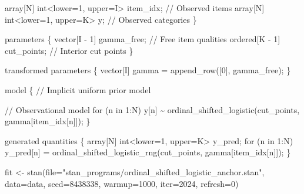 \documentclass[
  letterpaper,
  DIV=11,
  numbers=noendperiod]{scrartcl}
\newenvironment{Shaded}{\begin{snugshade}}{\end{snugshade}}
\newcommand{\AttributeTok}[1]{\textcolor[rgb]{0.40,0.45,0.13}{#1}}
\newcommand{\CommentTok}[1]{\textcolor[rgb]{0.37,0.37,0.37}{#1}}
\newcommand{\ControlFlowTok}[1]{\textcolor[rgb]{0.00,0.23,0.31}{#1}}
\newcommand{\DataTypeTok}[1]{\textcolor[rgb]{0.68,0.00,0.00}{#1}}
\newcommand{\DecValTok}[1]{\textcolor[rgb]{0.68,0.00,0.00}{#1}}
\newcommand{\FunctionTok}[1]{\textcolor[rgb]{0.28,0.35,0.67}{#1}}
\newcommand{\KeywordTok}[1]{\textcolor[rgb]{0.00,0.23,0.31}{#1}}
\newcommand{\NormalTok}[1]{\textcolor[rgb]{0.00,0.23,0.31}{#1}}
\newcommand{\OtherTok}[1]{\textcolor[rgb]{0.00,0.23,0.31}{#1}}
\newcommand{\StringTok}[1]{\textcolor[rgb]{0.13,0.47,0.30}{#1}}
\begin{document}
\begin{codelisting}
\begin{Shaded}
\begin{Highlighting}[]
  \DataTypeTok{array}\NormalTok{[N] }\DataTypeTok{int}\NormalTok{\textless{}}\KeywordTok{lower}\NormalTok{=}\DecValTok{1}\NormalTok{, }\KeywordTok{upper}\NormalTok{=I\textgreater{} item\_idx; }\CommentTok{// Observed items}
  \DataTypeTok{array}\NormalTok{[N] }\DataTypeTok{int}\NormalTok{\textless{}}\KeywordTok{lower}\NormalTok{=}\DecValTok{1}\NormalTok{, }\KeywordTok{upper}\NormalTok{=K\textgreater{} y;        }\CommentTok{// Observed categories}
\NormalTok{\}}

\KeywordTok{parameters}\NormalTok{ \{}
  \DataTypeTok{vector}\NormalTok{[I {-} }\DecValTok{1}\NormalTok{] gamma\_free;  }\CommentTok{// Free item qualities}
  \DataTypeTok{ordered}\NormalTok{[K {-} }\DecValTok{1}\NormalTok{] cut\_points; }\CommentTok{// Interior cut points}
\NormalTok{\}}

\KeywordTok{transformed parameters}\NormalTok{ \{}
  \DataTypeTok{vector}\NormalTok{[I] gamma = append\_row([}\DecValTok{0}\NormalTok{]\textquotesingle{}, gamma\_free);}
\NormalTok{\}}

\KeywordTok{model}\NormalTok{ \{}
  \CommentTok{// Implicit uniform prior model}
  
  \CommentTok{// Observational model}
  \ControlFlowTok{for}\NormalTok{ (n }\ControlFlowTok{in} \DecValTok{1}\NormalTok{:N)}
\NormalTok{    y[n] \textasciitilde{} ordinal\_shifted\_logistic(cut\_points, gamma[item\_idx[n]]);}
\NormalTok{\}}

\KeywordTok{generated quantities}\NormalTok{ \{}
  \DataTypeTok{array}\NormalTok{[N] }\DataTypeTok{int}\NormalTok{\textless{}}\KeywordTok{lower}\NormalTok{=}\DecValTok{1}\NormalTok{, }\KeywordTok{upper}\NormalTok{=K\textgreater{} y\_pred;}
  \ControlFlowTok{for}\NormalTok{ (n }\ControlFlowTok{in} \DecValTok{1}\NormalTok{:N)}
\NormalTok{    y\_pred[n] = ordinal\_shifted\_logistic\_rng(cut\_points,}
\NormalTok{                                             gamma[item\_idx[n]]);}
\NormalTok{\}}
\end{Highlighting}
\end{Shaded}

\end{codelisting}

\begin{Shaded}
\begin{Highlighting}[]
\NormalTok{fit }\OtherTok{\textless{}{-}} \FunctionTok{stan}\NormalTok{(}\AttributeTok{file=}\StringTok{"stan\_programs/ordinal\_shifted\_logistic\_anchor.stan"}\NormalTok{,}
            \AttributeTok{data=}\NormalTok{data, }\AttributeTok{seed=}\DecValTok{8438338}\NormalTok{,}
            \AttributeTok{warmup=}\DecValTok{1000}\NormalTok{, }\AttributeTok{iter=}\DecValTok{2024}\NormalTok{, }\AttributeTok{refresh=}\DecValTok{0}\NormalTok{)}
\end{Highlighting}
\end{Shaded}
\end{document}

